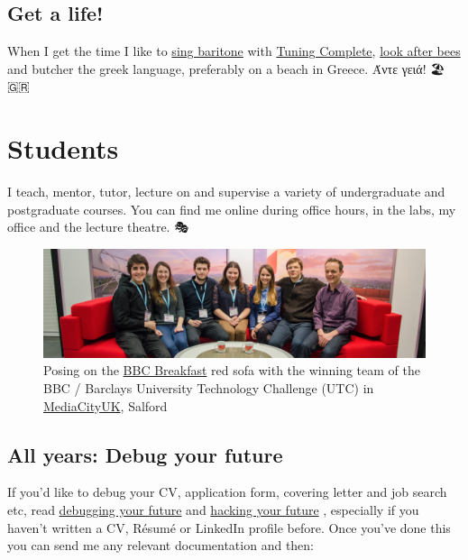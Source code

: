 \documentclass[
  12pt,
]{book}
\begin{document}
\hypertarget{get-a-life}{%
\section*{Get a life!}\label{get-a-life}}

When I get the time I like to \href{https://en.wikipedia.org/wiki/Baritone}{sing baritone} with \protect\hyperlink{tuningcomplete}{Tuning Complete}, \href{http://beelife.cs.manchester.ac.uk/}{look after bees} and butcher the greek language, preferably on a beach in Greece. Άντε γειά! 🏖️🇬🇷

\hypertarget{teaching}{%
\chapter{Students}\label{teaching}}

I teach, mentor, tutor, lecture on and supervise a variety of undergraduate and postgraduate courses. You can find me online during office hours, in the labs, my office and the lecture theatre. 🎭

\begin{figure}

{\centering \includegraphics[width=1\linewidth]{images/bbcbreakfastsofa} 

}

\caption{Posing on the \href{https://en.wikipedia.org/wiki/BBC_Breakfast}{BBC Breakfast} red sofa with the winning team of the BBC / Barclays University Technology Challenge (UTC) in \href{https://en.wikipedia.org/wiki/MediaCityUK}{MediaCityUK}, Salford}\label{fig:unnamed-chunk-1}
\end{figure}



\hypertarget{allyears}{%
\section{All years: Debug your future}\label{allyears}}

If you'd like to debug your CV, application form, covering letter and job search etc, read \href{https://www.cdyf.me/debugging.html}{debugging your future} \citep{debugyourfuture} and \href{https://www.cdyf.me/hacking.html}{hacking your future} \citep{hackingyourfuture}, especially if you haven't written a CV, Résumé or LinkedIn profile before. Once you've done this you can send me any relevant documentation and then:
\end{document}
